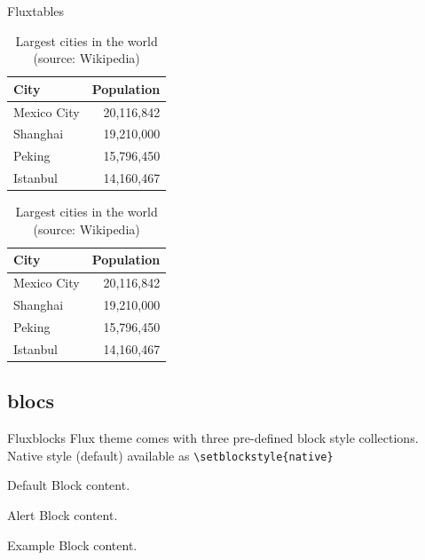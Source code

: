 \documentclass[9pt]{beamer}
\begin{document}
\begin{frame}{Flux}{tables}
  \begin{table}
    \caption{Largest cities in the world (source: Wikipedia)}
    \begin{tabular}{@{} lr @{}}
      \toprule
      City & Population\\
      \midrule
      Mexico City & 20,116,842\\
      Shanghai & 19,210,000\\
      Peking & 15,796,450\\
      Istanbul & 14,160,467\\
      \bottomrule
    \end{tabular}
    \hspace*{1cm}
        \setlength\extrarowheight{3pt}
    \begin{tabular}{|lr|}
      \hline
      \rowcolor{primaryLight}\color{background}City & \color{background}Population\\
      \hline
      Mexico City & 20,116,842\\
      Shanghai & 19,210,000\\
      Peking & 15,796,450\\
      Istanbul & 14,160,467\\
      \hline
    \end{tabular}
\end{table}
\end{frame}

\subsection{blocs}

\begin{frame}[fragile]{Flux}{blocks}
  		Flux theme comes with three pre-defined block style collections.\\
  		Native style (default) available as \verb+\setblockstyle{native}+\\[0.5cm]
  
   \centering
	\begin{minipage}[b]{0.5\textwidth}

	  \begin{block}{Default}
        Block content.
      \end{block}

      \begin{alertblock}{Alert}
        Block content.
      \end{alertblock}

      \begin{exampleblock}{Example}
        Block content.
      \end{exampleblock}      
      
	\end{minipage}
	
\end{frame}
\end{document}
